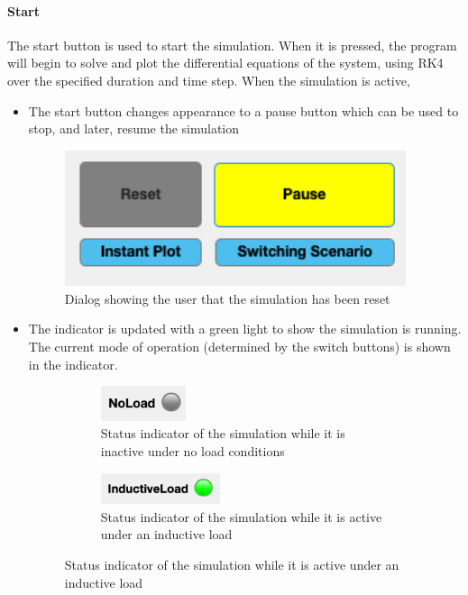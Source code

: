 \paragraph{Start} The start button is used to start the simulation. When it is pressed, the program will begin to solve and plot the differential equations of the system, using RK4 over the specified duration and time step.
When the simulation is active,
\begin{itemize}
	\item The start button changes appearance to a pause button which can be used to stop, and later, resume the simulation
\begin{figure}[H]
     \centering
     \includegraphics[width=10cm]{graphics/visualisation/pause_button}
     \caption{Dialog showing the user that the simulation has been reset}
\end{figure}
	\item The indicator is updated with a green light to show the simulation is running. The current mode of operation (determined by the switch buttons) is shown in the indicator.
\begin{figure}[H]
     \centering
     \begin{subfigure}[b]{0.45\textwidth}
         \centering
    	 \includegraphics[width=2.5cm]{graphics/visualisation/ui_indicator_load}
     	\caption{Status indicator of the simulation while it is inactive under no load conditions}
     \end{subfigure}
     \hfill
     \begin{subfigure}[b]{0.45\textwidth}
         \centering
    	 \includegraphics[width=3.5cm]{graphics/visualisation/ui_indicator_load_active}
     	\caption{Status indicator of the simulation while it is active under an inductive load}
     \end{subfigure}
     \hfill
\end{figure}
\end{itemize}

